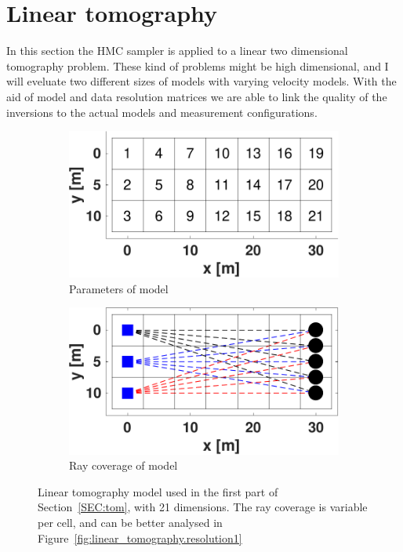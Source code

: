 \section{\label{SEC:tom}Linear tomography}

In this section the \gls{HMC} sampler is applied to a linear two dimensional tomography problem. These kind of problems might be high dimensional, and I will eveluate two different sizes of models with varying velocity models. With the aid of model and data resolution matrices we are able to link the quality of the inversions to the actual models and measurement configurations.

\begin{figure}
	\centering
	\begin{subfigure}{.5\textwidth}
		\centering
		\includegraphics[width=\textwidth]{figures/tomography/tomography_1/model_3by7_3s_5r}
		\caption{Parameters of model}
		\label{fig:linear_tomography.model1.parameters}
	\end{subfigure}%
	\begin{subfigure}{.5\textwidth}
		\centering
		\includegraphics[width=\textwidth]{figures/tomography/tomography_1/model_3by7_3s_5r_rays}
		\caption{Ray coverage of model}
		\label{fig:linear_tomography.model1.rays}
	\end{subfigure}
	\caption{Linear tomography model used in the first part of Section~\ref{SEC:tom}, with 21 dimensions. The ray coverage is variable per cell, and can be better analysed in Figure~\ref{fig:linear_tomography.resolution1}}
	\label{fig:linear_tomography.model1}
\end{figure}

